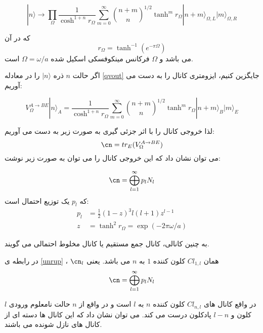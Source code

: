 \begin{equation}
	|n\rangle \to \prod_\Omega \frac{1}{\cosh^{1+n} r_\Omega} \sum_{m=0}^{\infty} \binom{n+m}{n} ^{1/2} \tanh^m r_\Omega |n+m\rangle_{\Omega,L} |m\rangle_{\Omega,R}
\end{equation}

که در آن 
\begin{equation}
r_\Omega = \tanh ^{-1} (e^{-\pi \Omega})
\end{equation}
می باشد و 
$\Omega$
فرکانس مینکوفسکی اسکیل شده 
$\Omega = \omega / a$
است.


اگر حالت 
$n$
ذره  
$|n\rangle$
را در معادله  
\ref{qvout}
جایگزین کنیم، ایزومتری کانال را به دست می آوریم:

\begin{equation}
	V_\Omega^{A \to BE} |n\rangle_A = \frac{1}{\cosh^{1+n} r_\Omega} \sum_{m=0}^{\infty} \binom{n+m}{n} ^{1/2} \tanh^m r_\Omega |n+m\rangle_{B} |m\rangle_{E}
\end{equation}

لذا خروجی کانال را با اثر جزئی گیری به صورت زیر به دست می آوریم:
\begin{equation}
	\cn = tr_E (V_\Omega ^{A \to BE})
\end{equation}
می توان نشان داد 
\cite{qit}
که این خروجی کانال را می توان به صورت زیر نوشت:

\begin{equation} \label{unrup}
	\cn = \bigoplus_{l=1}^{\infty} p_l N_l
\end{equation}
که 
$p_l$
یک توزیع احتمال است:
\begin{align}
	p_l &= \frac{1}{2} (1-z)^3 l (l+1) z^{l-1} \\
	z &= \tanh^2 r_\Omega = \exp (-2\pi \omega /a )  
\end{align}

به چنین کانالی، کانال جمع مستقیم
یا کانال مخلوط احتمالی
می گویند.

در رابطه ی 
\ref{unrup}
، 
$\cn_l$
همان
$Cl_{1,l}$
 کلون کننده
$1$
به 
$n$
می باشد. یعنی 
\begin{equation} \label{unru}
\cn = \bigoplus_{l=1}^{\infty} p_l N_l
\end{equation}


در واقع کانال های
$Cl_{n,l}$
کلون کننده 
$n$
به
$l$
است و در واقع از 
$n$
حالت نامعلوم ورودی
$l$
کلون و 
$l-n$
پادکلون
درست می کند. می توان نشان داد 
\cite{qit}
که این کانال ها دسته ای از کانال های نازل شونده
می باشند.


